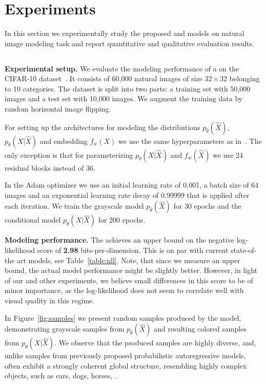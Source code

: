 \section{Experiments}\label{sec:experiments}

In this section we experimentally study the 
proposed \GRAY and \PYRAMID models on natural image modeling task
and report quantitative and qualitative evaluation results. 

\subsection{\GRAY} 

\textbf{Experimental setup.} We evaluate the modeling performance of 
a \GRAY on the CIFAR-10 dataset~\cite{krizhevsky2009learning}.
It consists of 60,000 natural images of size $32 \times 32$ belonging 
to 10 categories.
The dataset is split into two parts: a training set with 50,000 images 
and a test set with 10,000 images.
We augment the training data by random horizontal image flipping.

For setting up the architectures for modeling the distributions 
$p_{\hat\theta}(\widehat{X})$, $p_{\theta}(X|\widehat{X})$
and embedding $f_w(X)$ we use the same hyperparameters as in~\cite{salimans2016pixel}.
The only exception is that for parameterizing $p_{\theta}(X|\widehat{X})$ and $f_w(\widehat X)$
we use 24 residual blocks instead of 36.

In the Adam optimizer we use an initial learning rate of 0.001, a batch size of 
64 images and an exponential learning rate decay of 0.99999 that is applied after each iteration.
We train the grayscale model $p_{\hat\theta}(\widehat{X})$ for 30 epochs
and the conditional model $p_{\theta}(X|\widehat{X})$ for 200 epochs.

\textbf{Modeling performance.} The \GRAY achieves an upper bound 
on the negative log-likelihood score of \textbf{2.98} bits-per-dimension.
This is on par with current state-of-the art models, see Table~\ref{table:nll}.
Note, that since we measure an upper bound, the actual model performance might 
be slightly better. However, in light of our and other experiments, we believe 
small differences in this score to be of minor importance, as the log-likelihood 
does not seem to correlate well with visual quality in this regime. 

In Figure~\ref{fig:samples} we present random samples produced 
by the \GRAY model, demonstrating grayscale samples from 
$p_{\hat\theta}(\widehat{X})$ and resulting colored samples from $p_{\theta}(X|\widehat{X})$.
We observe that the produced samples are highly diverse, and, unlike samples 
from previously proposed probabilistic autoregressive models, often exhibit a 
strongly coherent global structure, resembling highly complex objects, such as 
cars, dogs, horses, \etc.

